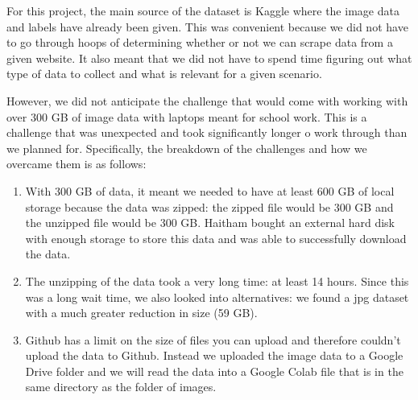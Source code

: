 \documentclass[11pt]{article}
\begin{document}
For this project, the main source of the dataset is Kaggle where
the image data and labels have already been given. 
This was convenient because we did not have to go through hoops 
of determining whether or not we can scrape data from a given 
website. It also meant that we did not have to spend time figuring 
out what type of data to collect and what is relevant for a given 
scenario. 

However, we did not anticipate the challenge that would come with working 
with over 300 GB of image data with laptops meant for school work. 
This is a challenge that was unexpected and took significantly longer 
o work through than we planned for. Specifically, the breakdown of 
the challenges and how we overcame them is as follows:

\begin{enumerate}
  \item With 300 GB of data, it meant we needed to have at least 
  600 GB of local storage because the data was zipped: the zipped 
  file would be 300 GB and the unzipped file would be 300 GB. 
  Haitham bought an external hard disk with enough storage to store 
  this data and was able to successfully download the data.
  \item The unzipping of the data took a very long time: 
  at least 14 hours. Since this was a long wait time, we also 
  looked into alternatives: we found a jpg dataset with a much
  greater reduction in size (59 GB).
  \item Github has a limit on the size of files you can upload and 
  therefore couldn't upload the data to Github. Instead we uploaded
  the image data to a Google Drive folder and we will read the data 
  into a Google Colab file that is in the same directory as the folder 
  of images.
\end{enumerate}

\printbibliography
\end{document}
